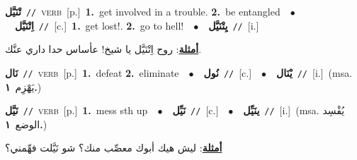 \documentclass[10pt,a4paper,twoside]{article} %
\begin{document}
\begin{multicols}{2}
{\setlength\topsep{0pt}\textbf{\foreignlanguage{arabic}{تْنَيَّل}}\ {\color{gray}\texttt{//}\color{black}}\ \textsc{verb}\ [p.]\ \textbf{1.}~get involved in a trouble.  \textbf{2.}~be entangled\ \ $\bullet$\ \ \setlength\topsep{0pt}\textbf{\foreignlanguage{arabic}{اِتْنَيَّل}}\ {\color{gray}\texttt{//}\color{black}}\ [c.]\ \textbf{1.}~get lost!.  \textbf{2.}~go to hell!\ \ $\bullet$\ \ \setlength\topsep{0pt}\textbf{\foreignlanguage{arabic}{يِتْنَيَّل}}\ {\color{gray}\texttt{//}\color{black}}\ [i.]\  \begin{flushright}\color{gray}\foreignlanguage{arabic}{\textbf{\underline{\foreignlanguage{arabic}{أمثلة}}}: روح اِتْنَيَّل يا شيخ! عأساس حدا داري عنَّك.}\end{flushright}\color{black}} \vspace{2mm}

{\setlength\topsep{0pt}\textbf{\foreignlanguage{arabic}{نَال}}\ {\color{gray}\texttt{//}\color{black}}\ \textsc{verb}\ [p.]\ \textbf{1.}~defeat  \textbf{2.}~eliminate\ \ $\bullet$\ \ \setlength\topsep{0pt}\textbf{\foreignlanguage{arabic}{نُول}}\ {\color{gray}\texttt{//}\color{black}}\ [c.]\ \ $\bullet$\ \ \setlength\topsep{0pt}\textbf{\foreignlanguage{arabic}{يْنَال}}\ {\color{gray}\texttt{//}\color{black}}\ [i.]\ \color{gray}(msa. \foreignlanguage{arabic}{يَهْزِم}~\foreignlanguage{arabic}{\textbf{١.}})\color{black}\ } \vspace{2mm}

{\setlength\topsep{0pt}\textbf{\foreignlanguage{arabic}{نَيَّل}}\ {\color{gray}\texttt{//}\color{black}}\ \textsc{verb}\ [p.]\ \textbf{1.}~mess sth up\ \ $\bullet$\ \ \setlength\topsep{0pt}\textbf{\foreignlanguage{arabic}{نَيِّل}}\ {\color{gray}\texttt{//}\color{black}}\ [c.]\ \ $\bullet$\ \ \setlength\topsep{0pt}\textbf{\foreignlanguage{arabic}{ينَيِّل}}\ {\color{gray}\texttt{//}\color{black}}\ [i.]\ \color{gray}(msa. \foreignlanguage{arabic}{يُفْسِد الوضع}~\foreignlanguage{arabic}{\textbf{١.}})\color{black}\  \begin{flushright}\color{gray}\foreignlanguage{arabic}{\textbf{\underline{\foreignlanguage{arabic}{أمثلة}}}: ليش هيك أبوك معصِّب منك؟ شو نَيَّلت فهِّمني؟}\end{flushright}\color{black}} \vspace{2mm}


\end{multicols}
\end{document}
